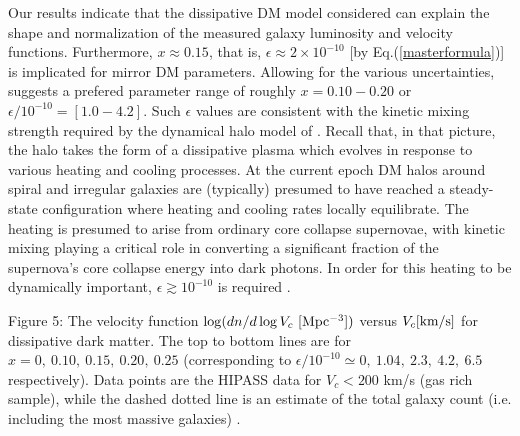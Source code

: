 \documentclass[12pt]{article}
\begin{document}
Our results indicate that the dissipative DM model considered can explain the shape and normalization of the measured galaxy luminosity and velocity
functions.
Furthermore, $x \approx 0.15$, that is, $\epsilon \approx 2\times 10^{-10}$
[by Eq.(\ref{masterformula})] is implicated for mirror DM parameters. 
Allowing for the various uncertainties, suggests a prefered parameter range of roughly $x = 0.10 - 0.20$ or $\epsilon/10^{-10} = [1.0 - 4.2]$. 
Such $\epsilon$ values are consistent with the kinetic mixing strength required by the
dynamical halo model of \cite{sph,footexploredb,rich8}. Recall that, in that picture, 
the halo takes the form of a dissipative plasma which evolves in
response to various heating and cooling processes. At the current epoch DM halos around spiral and irregular galaxies are (typically) 
presumed to have reached a steady-state configuration where heating and cooling rates locally equilibrate. 
The heating is presumed to arise from ordinary core collapse supernovae, with kinetic mixing playing a critical 
role in converting a significant fraction of the supernova's 
core collapse energy into dark photons. In order for this heating to be dynamically important, $\epsilon \gtrsim 10^{-10}$ is required .


\vskip 0.7cm
\centerline{}
\vskip 0.3cm
\noindent
{\small Figure 5: The velocity function $\log (dn/d\log V_c \ [\rm Mpc^{-3}])$ versus $V_c [\rm km/s]$ 
for dissipative dark matter. 
The top to bottom lines are for $x=0, \ 0.10, \ 0.15, \ 0.20, \ 0.25$ 
(corresponding to $\epsilon/10^{-10} \simeq 0, \ 1.04, \  2.3, \ 4.2, \ 6.5$ respectively).
Data points are the 	HIPASS data for $V_c < 200$ km/s (gas rich sample), while the dashed dotted line
is an estimate of the total galaxy count (i.e. including the most massive galaxies) \cite{Zwaan}.}
\vskip 1.4cm


\noindent
\end{document}
